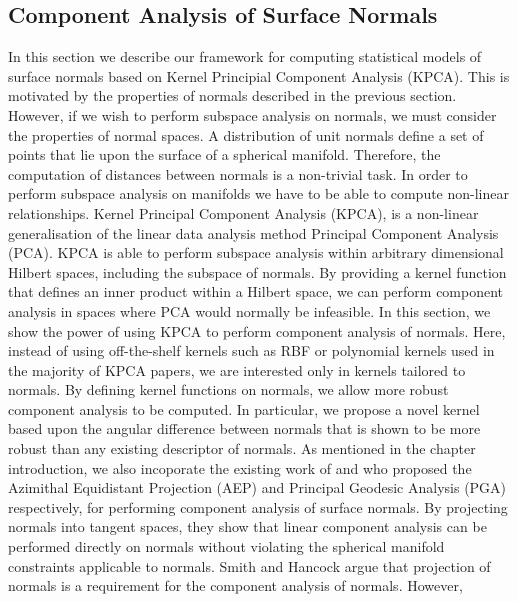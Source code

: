 \subsection{Component Analysis of Surface Normals}\label{subsec:singl_img_ca}
In this section we describe our framework for computing statistical models of
surface normals based on Kernel Principial Component Analysis (KPCA). This is
motivated by the properties of normals described in the previous section.
However, if we wish to perform subspace analysis on normals, we must consider
the properties of normal spaces. A distribution of unit normals define a set of
points that lie upon the surface of a spherical manifold. Therefore, the
computation of distances between normals is a non-trivial task. In order to
perform subspace analysis on manifolds we have to be able to compute non-linear
relationships. Kernel Principal Component Analysis (KPCA), is a non-linear
generalisation of the linear data analysis method Principal Component Analysis
(PCA). KPCA is able to perform subspace analysis within arbitrary dimensional
Hilbert spaces, including the subspace of normals. By providing a kernel
function that defines an inner product within a Hilbert space, we can perform
component analysis in spaces where PCA would normally be infeasible. In this
section, we show the power of using KPCA to perform component analysis of
normals. Here, instead of using off-the-shelf kernels such as RBF or polynomial
kernels used in the majority of KPCA papers, we are interested only in kernels
tailored to normals. By defining kernel functions on normals, we allow more
robust component analysis to be computed. In particular, we propose a novel
kernel based upon the angular difference between normals that is shown to be
more robust than any existing descriptor of normals. 
As mentioned in the chapter introduction, we also incoporate the existing work of
\citet{smith2006recovering} and \citet{smith2008facial} who proposed the
Azimithal Equidistant Projection (AEP) and Principal Geodesic Analysis (PGA)
respectively, for performing component analysis of surface normals. By
projecting normals into tangent spaces, they show that linear component analysis
can be performed directly on normals without violating the spherical manifold
constraints applicable to normals. Smith and Hancock argue that projection of
normals is a requirement for the component analysis of normals. However,
